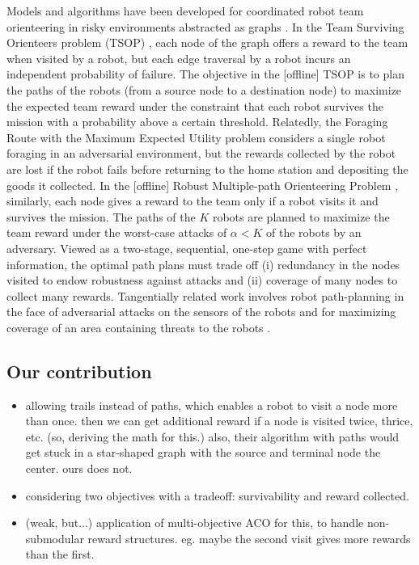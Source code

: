 \documentclass[11pt, oneside]{article}
\begin{document}
Models and algorithms have been developed for coordinated robot team orienteering in risky environments abstracted as graphs \cite{zhou2021multi}. 
In the Team Surviving Orienteers problem (TSOP) \cite{jorgensen2018team,jorgensen2017matroid,jorgensen2024matroid}, each node of the graph offers a reward to the team when visited by a robot, but each edge traversal by a robot incurs an independent probability of failure. The objective in the [offline] TSOP is to plan the paths of the robots (from a source node to a destination node) to maximize the expected team reward under the constraint that each robot survives the mission with a probability above a certain threshold. 
Relatedly, the Foraging Route with the Maximum Expected Utility problem \cite{di2022foraging} considers a single robot foraging in an adversarial environment, but the rewards collected by the robot are lost if the robot fails before returning to the home station and depositing the goods it collected.
In the [offline] Robust Multiple-path Orienteering Problem \cite{shi2023robust}, similarly, each node gives a reward to the team only if a robot visits it and survives the mission. The paths of the $K$ robots are planned to maximize the team reward under the worst-case attacks of $\alpha<K$ of the robots by an adversary. 
Viewed as a two-stage, sequential, one-step game with perfect information, the optimal path plans must trade off (i) redundancy in the nodes visited to endow robustness against attacks and (ii) coverage of many nodes to collect many rewards.
Tangentially related work involves robot path-planning in the face of adversarial attacks on the sensors of the robots \cite{liu2021distributed,zhou2022distributed} and for maximizing coverage of an area containing threats to the robots \cite{korngut2023multi,yehoshua2016robotic}.

\subsection{Our contribution}
\begin{itemize}
    \item allowing trails instead of paths, which enables a robot to visit a node more than once. then we can get additional reward if a node is visited twice, thrice, etc. (so, deriving the math for this.) also, their algorithm with paths would get stuck in a star-shaped graph with the source and terminal node the center. ours does not.
   \item considering two objectives with a tradeoff: survivability and reward collected.
   \item  (weak, but...) application of multi-objective ACO for this, to handle non-submodular reward structures. eg. maybe the second visit gives more rewards than the first.
\end{itemize}
\end{document}
